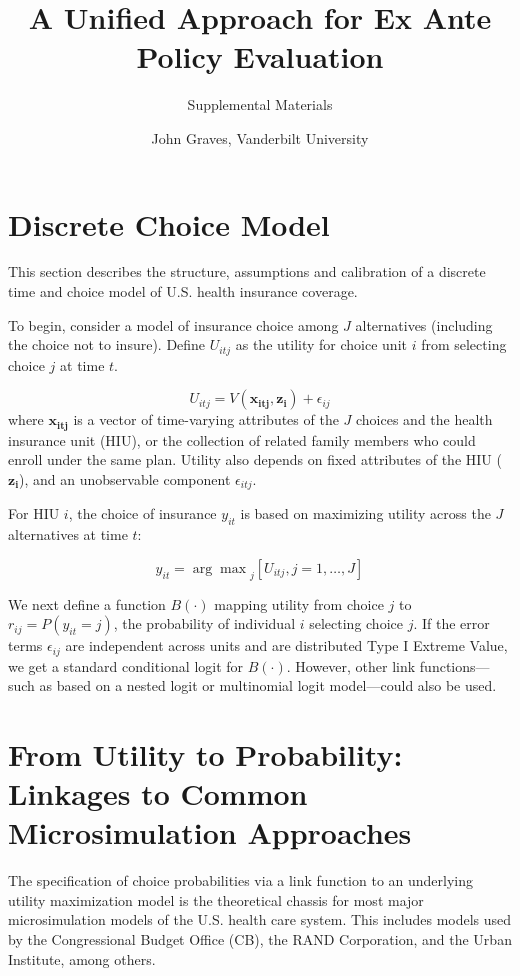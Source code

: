 \documentclass[]{article}
\title{A Unified Approach for Ex Ante Policy Evaluation}
\subtitle{Supplemental Materials}
\author{John Graves, Vanderbilt University}
\date{}
\begin{document}
\maketitle

\hypertarget{discrete-choice-model}{%
\section{Discrete Choice Model}\label{discrete-choice-model}}

This section describes the structure, assumptions and calibration of a
discrete time and choice model of U.S. health insurance coverage.

To begin, consider a model of insurance choice among \(J\) alternatives
(including the choice not to insure). Define \(U_{itj}\) as the utility
for choice unit \(i\) from selecting choice \(j\) at time \(t\).

\[
U_{itj} = V(\mathbf{x_{itj}}, \mathbf{z_i})+ \epsilon_{ij}
\] \noindent where \(\mathbf{x_{itj}}\) is a vector of time-varying
attributes of the \(J\) choices and the health insurance unit (HIU), or
the collection of related family members who could enroll under the same
plan. Utility also depends on fixed attributes of the HIU
(\(\mathbf{z_i}\)), and an unobservable component \(\epsilon_{itj}\).

For HIU \(i\), the choice of insurance \(y_{it}\) is based on maximizing
utility across the \(J\) alternatives at time \(t\):

\[
y_{it} = {\arg \max}_j [U_{itj}, j = 1, \dots, J]
\]

We next define a function \(B(\cdot)\) mapping utility from choice \(j\)
to \(r_{ij} = P(y_{it} = j)\), the probability of individual \(i\)
selecting choice \(j\). If the error terms \(\epsilon_{ij}\) are
independent across units and are distributed Type I Extreme Value, we
get a standard conditional logit for \(B(\cdot)\). However, other link
functions---such as based on a nested logit or multinomial logit
model---could also be used.

\hypertarget{from-utility-to-probability-linkages-to-common-microsimulation-approaches}{%
\section{From Utility to Probability: Linkages to Common Microsimulation
Approaches}\label{from-utility-to-probability-linkages-to-common-microsimulation-approaches}}

The specification of choice probabilities via a link function to an
underlying utility maximization model is the theoretical chassis for
most major microsimulation models of the U.S. health care system. This
includes models used by the Congressional Budget Office (CB), the RAND
Corporation, and the Urban Institute, among others.
\end{document}
